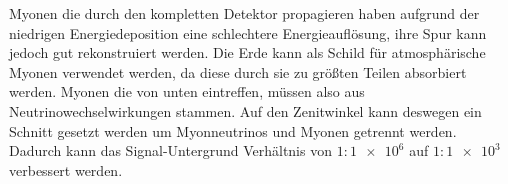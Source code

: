Myonen die durch den kompletten Detektor propagieren haben aufgrund der niedrigen Energiedeposition eine schlechtere Energieaufl\"osung, ihre Spur kann jedoch gut rekonstruiert werden.
Die Erde kann als Schild f\"ur atmosph\"arische Myonen verwendet werden, da diese durch sie zu gr\"o\ss ten Teilen absorbiert werden. Myonen die von unten eintreffen, m\"ussen also aus Neutrinowechselwirkungen stammen.
Auf den Zenitwinkel kann deswegen ein Schnitt gesetzt werden um Myonneutrinos und Myonen getrennt werden. Dadurch kann das Signal-Untergrund Verh\"altnis von $1:\num{1e6}$ auf $1:\num{1e3}$ verbessert werden. 
